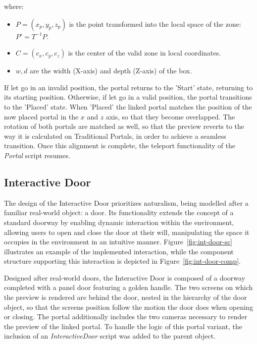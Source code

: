 where:
\begin{itemize}
    \item $P = (x_p, y_p, z_p)$ is the point transformed into the local space of the zone: $P' = T^{-1} P$.
    \item $C = (c_x, c_y, c_z)$ is the center of the valid zone in local coordinates.
    \item $w, d$ are the width (X-axis) and depth (Z-axis) of the box.
\end{itemize}

If let go in an invalid position, the portal returns to the 'Start' state, returning to its starting position. Otherwise, if let go in a valid 
position, the portal transitions to the 'Placed' state. When 'Placed' the linked portal matches the position of the now placed portal in the $x$ and 
$z$ axis, so that they become overlapped. The rotation of both portals are matched as well, so that the preview reverts to the way it is calculated on Traditional 
Portals, in order to achieve a seamless transition. Once this alignment is complete, the teleport functionality of the \textit{Portal} script resumes.

\subsection{Interactive Door}
\label{sec:interactive-door}

The design of the Interactive Door prioritizes naturalism, being modelled after a familiar real-world object: a door.
Its functionality extends the concept of a standard doorway by enabling dynamic interaction within the environment, 
allowing users to open and close the door at their will, manipulating the space it occupies in the environment 
in an intuitive manner. Figure~\ref{fig:int-door-sc} 
illustrates an example of the implemented interaction, while the component structure supporting this interaction is depicted 
in Figure~\ref{fig:int-door-comp}.

Designed after real-world doors, the Interactive Door is composed of a doorway completed with a panel door featuring a golden handle. 
The two screens on which the preview is rendered are behind the door, nested in the hierarchy of the door object, so that the screens position follow 
the motion the door does when opening or closing. The portal additionally includes the two cameras necessary to render the preview of the linked portal.
To handle the logic of this portal variant, the inclusion of an \textit{InteractiveDoor} script was added to the parent object.

